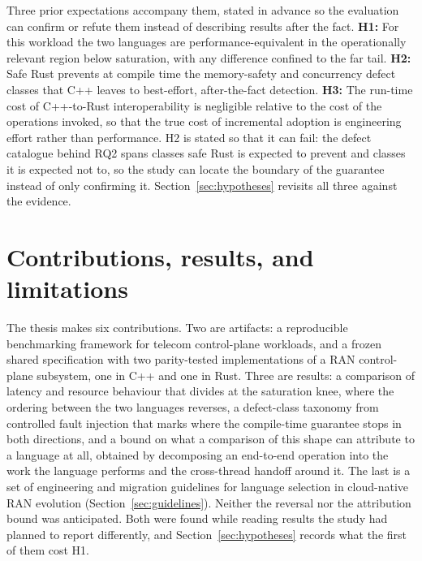 \documentclass[english,oneside,a4paper,censored,csm,software-track-2020]{HYthesisML}
\begin{document}
Three prior expectations accompany them, stated in advance so the evaluation can confirm or
refute them instead of describing results after the fact. \textbf{H1:} For this workload the two
languages are performance-equivalent in the operationally relevant region below saturation, with
any difference confined to the far tail. \textbf{H2:} Safe Rust prevents at compile time the
memory-safety and concurrency defect classes that C++ leaves to best-effort, after-the-fact
detection. \textbf{H3:} The run-time cost of C++-to-Rust interoperability is negligible relative
to the cost of the operations invoked, so that the true cost of incremental adoption is
engineering effort rather than performance. H2 is stated so that it can fail: the defect
catalogue behind RQ2 spans classes safe Rust is expected to prevent and classes it is expected
not to, so the study can locate the boundary of the guarantee instead of only confirming it.
Section~\ref{sec:hypotheses} revisits all three against the evidence.

\section{Contributions, results, and limitations}
The thesis makes six contributions. Two are artifacts: a reproducible benchmarking framework for
telecom control-plane workloads, and a frozen shared specification with two parity-tested
implementations of a RAN control-plane subsystem, one in C++ and one in Rust. Three are results:
a comparison of latency and resource behaviour that divides at the saturation knee, where the
ordering between the two languages reverses, a defect-class taxonomy from controlled fault
injection that marks where the compile-time guarantee stops in both directions, and a bound on
what a comparison of this shape can attribute to a language at all, obtained by decomposing an
end-to-end operation into the work the language performs and the cross-thread handoff around it.
The last is a set of engineering and migration guidelines for language selection in cloud-native
RAN evolution (Section~\ref{sec:guidelines}). Neither the reversal nor the attribution bound was
anticipated. Both were found while reading results the study had planned to report differently,
and Section~\ref{sec:hypotheses} records what the first of them cost H1.
\end{document}
